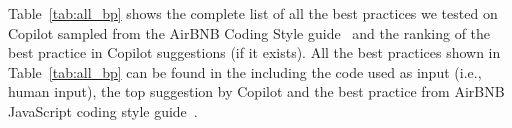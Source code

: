 
Table~\ref{tab:all_bp} shows the complete list of all the best practices we tested on Copilot sampled from the AirBNB Coding Style guide~\cite{airbnb_code} and the ranking of the best practice in Copilot suggestions (if it exists).
All the best practices shown in Table~\ref{tab:all_bp} can be found in the \repl{} including the code used as input (i.e., human input), the top suggestion by Copilot and the best practice from AirBNB JavaScript coding style guide~\cite{airbnb_code}.

\begin{table}[hbt!]
        \centering
    \begin{tabular}{|c|c|c|}
        \hline


\end{tabular}
\end{table}
